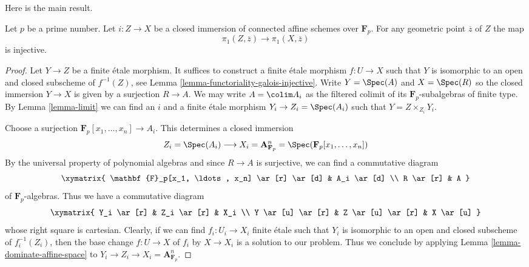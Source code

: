 \noindent
Here is the main result.

\begin{proposition}
\label{proposition-injective}
Let $p$ be a prime number. Let $i : Z \to X$ be a closed immersion
of connected affine schemes over $\mathbf{F}_p$. For any geometric
point $\overline{z}$ of $Z$ the map
$$
\pi_1(Z, \overline{z}) \to \pi_1(X, \overline{z})
$$
is injective.
\end{proposition}

\begin{proof}
Let $Y \to Z$ be a finite \'etale morphism. It suffices to construct
a finite \'etale morphism $f : U \to X$ such that $Y$ is isomorphic to
an open and closed subscheme of $f^{-1}(Z)$, see
Lemma \ref{lemma-functoriality-galois-injective}.
Write $Y = \Spec(A)$ and $X = \Spec(R)$ so the closed immersion
$Y \to X$ is given by a surjection $R \to A$. We may write
$A = \colim A_i$ as the filtered colimit of its $\mathbf{F}_p$-subalgebras
of finite type. By Lemma \ref{lemma-limit}
we can find an $i$ and a finite \'etale morphism $Y_i \to Z_i = \Spec(A_i)$
such that $Y = Z \times_{Z_i} Y_i$.

\medskip\noindent
Choose a surjection $\mathbf{F}_p[x_1, \ldots, x_n] \to A_i$.
This determines a closed immersion
$$
Z_i = \Spec(A_i)
\longrightarrow
X_i = \mathbf{A}^n_{\mathbf{F}_p} = \Spec(\mathbf{F}_p[x_1, \ldots, x_n])
$$
By the universal property of polynomial algebras and since
$R \to A$ is surjective, we can find a commutative diagram
$$
\xymatrix{
\mathbf{F}_p[x_1, \ldots, x_n] \ar[r] \ar[d] &
A_i \ar[d] \\
R \ar[r] &
A
}
$$
of $\mathbf{F}_p$-algebras. Thus we have a commutative diagram
$$
\xymatrix{
Y_i \ar[r] &
Z_i \ar[r] &
X_i \\
Y \ar[u] \ar[r] &
Z \ar[u] \ar[r] &
X \ar[u]
}
$$
whose right square is cartesian. Clearly, if we can
find $f_i : U_i \to X_i$ finite \'etale such that $Y_i$ is
isomorphic to an open and closed subscheme of $f_i^{-1}(Z_i)$,
then the base change $f : U \to X$ of $f_i$ by $X \to X_i$
is a solution to our problem. Thus we conclude by applying
Lemma \ref{lemma-dominate-affine-space} to
$Y_i \to Z_i \to X_i = \mathbf{A}^n_{\mathbf{F}_p}$.
\end{proof}

















